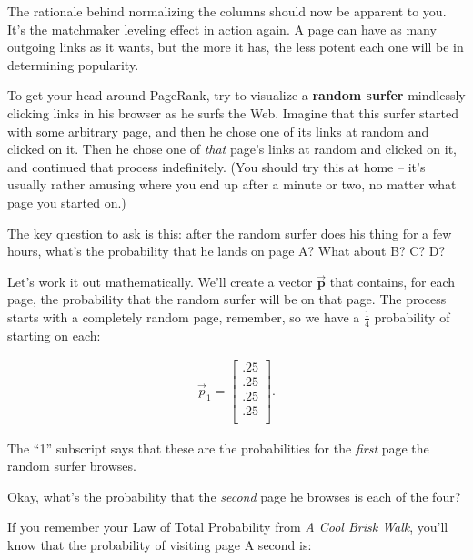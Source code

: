 \begin{alttitles}
The rationale behind normalizing the columns should now be apparent to you.
It's the matchmaker leveling effect in action again. A page can have as many
outgoing links as it wants, but the more it has, the less potent each one will
be in determining popularity.

\medskip


To get your head around PageRank, try to visualize a \textbf{random surfer}
mindlessly clicking links in his browser as he surfs the Web. Imagine that
this surfer started with some arbitrary page, and then he chose one of its
links at random and clicked on it. Then he chose one of \textit{that} page's
links at random and clicked on it, and continued that process indefinitely.
(You should try this at home -- it's usually rather amusing where you end up
after a minute or two, no matter what page you started on.)

The key question to ask is this: after the random surfer does his thing for a
few hours, what's the probability that he lands on page A? What about B? C? D?

Let's work it out mathematically. We'll create a vector
$\overrightarrow{\textbf{p}}$ that contains, for each page, the probability
that the random surfer will be on that page. The process starts with a
completely random page, remember, so we have a $\frac{1}{4}$ probability of
starting on each:

\vspace{-.2in}
\begin{align*}
\overrightarrow{p}_1 =
\begin{bmatrix}
.25 \\
.25 \\
.25 \\
.25 \\
\end{bmatrix}.
\end{align*}
\vspace{-.2in}

The ``1'' subscript says that these are the probabilities for the
\textit{first} page the random surfer browses.

Okay, what's the probability that the \textit{second} page he browses is each
of the four?


If you remember your Law of Total Probability from \textit{A Cool Brisk Walk},
you'll know that the probability of visiting page A second is:


\end{alttitles}
